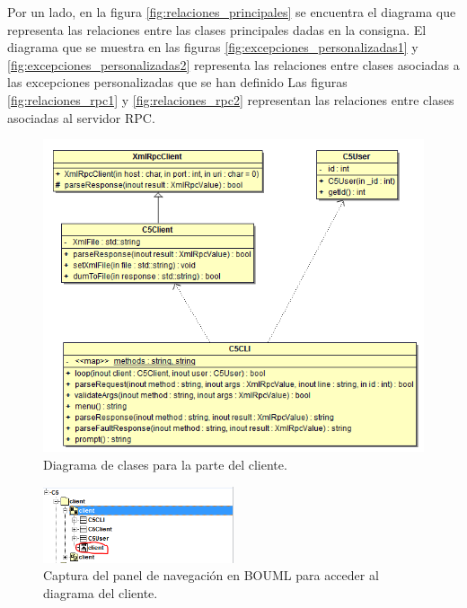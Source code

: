 \documentclass[a4paper,12pt]{article}
\begin{document}
Por un lado, en la figura \ref{fig:relaciones_principales} se encuentra el diagrama que representa las relaciones entre las clases principales dadas en la consigna.
El diagrama que se muestra en las figuras \ref{fig:excepciones_personalizadas1} y \ref{fig:excepciones_personalizadas2}
representa las relaciones entre clases asociadas a las excepciones personalizadas que se han definido
Las figuras \ref{fig:relaciones_rpc1} y \ref{fig:relaciones_rpc2} representan las relaciones entre clases asociadas al servidor RPC.

\begin{figure}[htbp]
    \centering
    \includegraphics[width=\textwidth]{C5/Esquema_general_C5_cliente.PNG}
    \caption{Diagrama de clases para la parte del cliente.}
    \label{fig:cliente}
\end{figure}

\begin{figure}[htbp]
    \centering
    \includegraphics[width=0.5\textwidth]{C5/Esquema_general_C5_cliente_panel.PNG}
    \caption{Captura del panel de navegación en BOUML para acceder al diagrama del cliente.}
    \label{fig:navegacion_cliente}
\end{figure}
\end{document}
